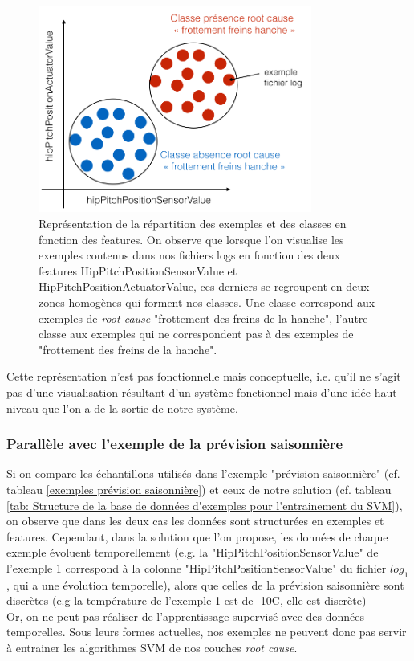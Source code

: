 \begin{figure}[h]
	\centering\includegraphics[width=9cm]{images/classes_log.png}
	\caption[Représentation de la répartition des exemples et des classes en fonction des features]{Représentation de la répartition des exemples et des classes en fonction des features. On observe que lorsque l'on visualise les exemples contenus dans nos fichiers logs en fonction des deux features HipPitchPositionSensorValue et HipPitchPositionActuatorValue, ces derniers se regroupent en deux zones homogènes qui forment nos classes. Une classe correspond aux exemples de \emph{root cause} "frottement des freins de la hanche", l'autre classe aux exemples qui ne correspondent pas à des exemples de "frottement des freins de la hanche".}
	\label{fig:Représentation de la répartition des exemples et des classes en fonction des features}
\end{figure}
Cette représentation n'est pas fonctionnelle mais conceptuelle, i.e. qu'il ne s'agit pas d'une visualisation résultant d'un système fonctionnel mais d'une idée haut niveau que l'on a de la sortie de notre système. 


\subsubsection{Parallèle avec l'exemple de la prévision saisonnière}
\label{Automatisation du processus d'investigation: Achitecture High Level du système proposé: Les exemples: Parallèle avec l'exemple de la prévision saisonnière}
Si on compare les échantillons utilisés dans l'exemple "prévision saisonnière" (cf. tableau \ref{exemples prévision saisonnière}) et ceux de notre solution (cf. tableau \ref {tab: Structure de la base de données d'exemples pour l'entrainement du SVM}), on observe que dans les deux cas les données sont structurées en exemples et features. Cependant, dans la solution que l'on propose, les données de chaque exemple évoluent temporellement (e.g. la "HipPitchPositionSensorValue" de l'exemple 1 correspond à la colonne "HipPitchPositionSensorValue" du fichier $log_1$, qui a une évolution temporelle), alors que celles de la prévision saisonnière sont discrètes (e.g la température de l'exemple 1 est de -10\degres C, elle est discrète) \\
Or, on ne peut pas réaliser de l'apprentissage supervisé avec des données temporelles. Sous leurs formes actuelles, nos exemples ne peuvent donc pas servir à entrainer les algorithmes SVM de nos couches \emph{root cause}.


